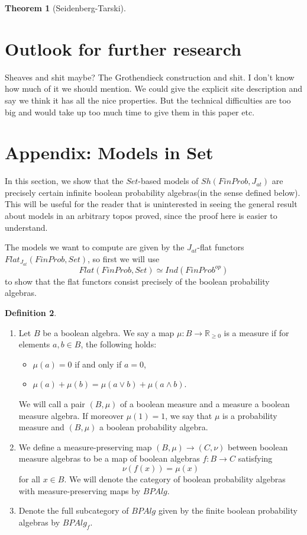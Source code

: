 \documentclass[a4paper]{amsproc}
\theoremstyle{plain}
\newtheorem{theorem}{Theorem}[section]
\theoremstyle{definition}
\newtheorem{definition}[theorem]{Definition}
\theoremstyle{remark}
\numberwithin{equation}{section}
\begin{document}
\begin{theorem}[Seidenberg-Tarski]

\end{theorem}


\section{Outlook for further research}
Sheaves and shit maybe? The Grothendieck construction and shit. I don't know how much of it we should mention. We could give the explicit site description and say we think it has all the nice properties. But the technical difficulties are too big and would take up too much time to give them in this paper etc.
\section{Appendix: Models in Set}

In this section, we show that the $Set$-based models of $Sh(FinProb, J_{at})$ are precisely certain infinite boolean probability algebras(in the sense defined below). This will be useful for the reader that is uninterested in seeing the general result about models in an arbitrary topos proved, since the proof here is easier to understand.


The models we want to compute are given by the $J_{at}$-flat functors\linebreak
 $Flat_{J_{at}}(FinProb, Set)$, so first we will use 
\[
Flat(FinProb, Set) \simeq Ind(FinProb^{op})
\]
to show that the flat functors consist precisely of the boolean probability algebras.

\begin{definition}
\begin{enumerate}
\item Let $B$ be a boolean algebra. We say a map $\mu: B \to \mathbb{R}_{\geq 0}$ is a measure if for elements $a,b \in B$, the following holds:
\begin{itemize}
\item $\mu(a) = 0$ if and only if $a = 0 $,
\item $\mu(a) + \mu(b) = \mu(a \vee b) + \mu(a \wedge b)$.
\end{itemize}
We will call a pair $(B, \mu)$ of a boolean measure and a measure a boolean measure algebra. If moreover $\mu(1) = 1$, we say that $\mu$ is a  probability measure and $(B,\mu)$ a boolean probability algebra.
\item We define a measure-preserving map $(B, \mu) \to (C, \nu)$ between boolean measure algebras to be a map of boolean algebras $f: B \to C$ satisfying
\[
\nu(f(x)) = \mu(x)
\]
for all $x \in B$. We will denote the category of boolean probability algebras with measure-preserving maps by $BPAlg$.
\item Denote the full subcategory of $BPAlg$ given by the finite boolean probability algebras by $BPAlg_f$.
\end{enumerate}
\end{definition}
\end{document}
